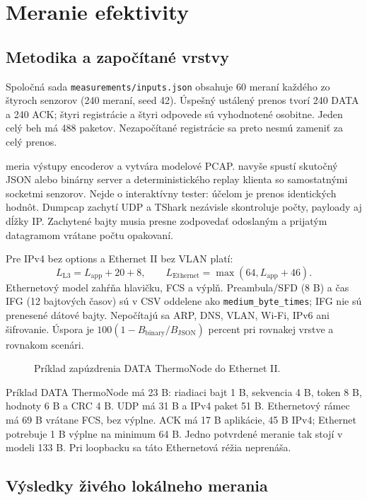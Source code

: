 \documentclass[12pt,a4paper]{article}
\begin{document}
\clearpage
\section{Meranie efektivity}

\subsection{Metodika a započítané vrstvy}

Spoločná sada \texttt{measurements/inputs.json} obsahuje 60 meraní každého zo štyroch senzorov (240 meraní, seed 42). Úspešný ustálený prenos tvorí 240 DATA a 240 ACK; štyri registrácie a štyri odpovede sú vyhodnotené osobitne. Jeden celý beh má 488 paketov. Nezapočítané registrácie sa preto nesmú zameniť za celý prenos.

 meria výstupy encoderov a vytvára modelové PCAP.  navyše spustí skutočný JSON alebo binárny server a deterministického replay klienta so samostatnými socketmi senzorov. Nejde o interaktívny tester: účelom je prenos identických hodnôt. Dumpcap zachytí UDP a TShark nezávisle skontroluje počty, payloady aj dĺžky IP. Zachytené bajty musia presne zodpovedať odoslaným a prijatým datagramom vrátane počtu opakovaní.

Pre IPv4 bez options a Ethernet II bez VLAN platí:
\[
L_{\mathrm{L3}}=L_{\mathrm{app}}+20+8,\qquad
L_{\mathrm{Ethernet}}=\max(64,L_{\mathrm{app}}+46).
\]
Ethernetový model zahŕňa hlavičku, FCS a výplň. Preambula/SFD (8 B) a čas IFG (12 bajtových časov) sú v CSV oddelene ako \texttt{medium\_byte\_times}; IFG nie sú prenesené dátové bajty. Nepočítajú sa ARP, DNS, VLAN, Wi-Fi, IPv6 ani šifrovanie. Úspora je $100(1-B_{\mathrm{binary}}/B_{\mathrm{JSON}})$ percent pri rovnakej vrstve a rovnakom scenári.

\begin{figure}[!htbp]
\centering

\caption{Príklad zapúzdrenia DATA ThermoNode do Ethernet II.}
\end{figure}

Príklad DATA ThermoNode má 23 B: riadiaci bajt 1 B, sekvencia 4 B, token 8 B, hodnoty 6 B a CRC 4 B. UDP má 31 B a IPv4 paket 51 B. Ethernetový rámec má 69 B vrátane FCS, bez výplne. ACK má 17 B aplikácie, 45 B IPv4; Ethernet potrebuje 1 B výplne na minimum 64 B. Jedno potvrdené meranie tak stojí v modeli 133 B. Pri loopbacku sa táto Ethernetová réžia neprenáša.

\subsection{Výsledky živého lokálneho merania}
\end{document}
